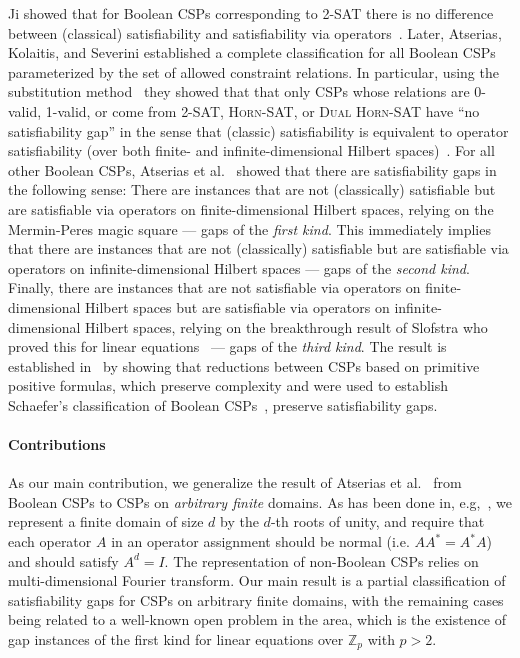 \documentclass[11pt,letter]{article}
\begin{document}
Ji showed that for Boolean CSPs corresponding to \textsc{2-SAT} there is no difference between (classical)
satisfiability and satisfiability via operators~\cite{Ji13:arxiv-binary}.
Later, Atserias, Kolaitis, and Severini established a complete classification for all Boolean CSPs parameterized by the set of
allowed constraint relations. In particular, using the
substitution method~\cite{Cleve14:icalp} they showed that
that only CSPs whose
relations are 0-valid, 1-valid, or come from \textsc{2-SAT}, \textsc{Horn-SAT}, or \textsc{Dual
Horn-SAT} have ``no satisfiability gap'' in the sense that (classic)
satisfiability is equivalent to operator satisfiability (over both finite- and
infinite-dimensional Hilbert spaces)~\cite{AKS19:jcss}. 
For all other Boolean CSPs, Atserias et al.~\cite{AKS19:jcss} showed that there are
satisfiability gaps in the
following sense: There are instances that are not (classically) satisfiable but are
satisfiable via operators on finite-dimensional Hilbert spaces, relying on the Mermin-Peres magic
square --- gaps of the \emph{first kind}.  This immediately implies that
there are instances that are not (classically) satisfiable but are satisfiable
via operators on infinite-dimensional Hilbert spaces --- gaps
of the \emph{second kind}. Finally, there are instances that are not satisfiable via
operators on finite-dimensional Hilbert spaces but are satisfiable via
operators on infinite-dimensional Hilbert spaces, relying on the 
breakthrough result of Slofstra who proved this for linear
equations~\cite{Slofstra20:jams} --- gaps of the \emph{third kind}.
The result is
established in~\cite{AKS19:jcss} by showing that reductions between CSPs based on primitive positive
formulas, which preserve complexity and were used to establish Schaefer's
classification of Boolean CSPs~\cite{Schaefer78:stoc}, preserve satisfiability gaps.

\paragraph{Contributions}

As our main contribution, we generalize the result of Atserias et
al.~\cite{AKS19:jcss} from Boolean CSPs to CSPs on \emph{arbitrary finite}
domains.
As has been done in, e.g,~\cite{Culf23:arxiv,Goemans04:jcss,Qassim20:jpa}, we represent a
finite domain of size $d$ by the $d$-th roots of unity, and require that each
operator $A$ in an operator assignment should be normal (i.e. $AA^*=A^*A$) and
should satisfy $A^d=I$. The representation of non-Boolean CSPs relies on
multi-dimensional Fourier transform. Our main result is a partial classification
of satisfiability gaps for CSPs on arbitrary finite domains, with the remaining
cases being related to a well-known open problem in the area, which is the
existence of gap instances of the first kind for linear equations over
$\mathbb{Z}_p$ with $p>2$. 
\end{document}
